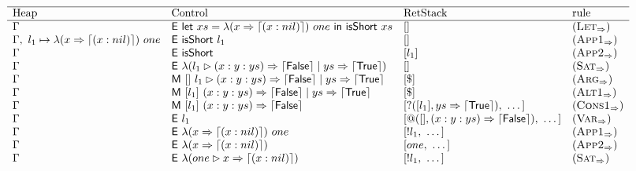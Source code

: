 \begin{figure*}
    \[
        \begin{array}{llll}
            \hline
            \text{Heap} & \text{Control}                                            & \text{RetStack}                                   & \text{rule}            \\
            \hline
            \Gamma      & \textsf{E}~\textsf{let}~xs = \lambda(x \Rightarrow \left\lceil (x : nil)\right\rceil)~one~\textsf{in}~\textsf{isShort}~xs & []                                                & (\textsc{Let}_{\Rightarrow})      \\
            \Gamma ,~ l_1 \mapsto \lambda(x \Rightarrow \left\lceil (x : nil)\right\rceil)~one
                        & \textsf{E}~\textsf{isShort}~l_1                                & []                                                & (\textsc{App1}_{\Rightarrow})     \\
            \Gamma      & \textsf{E}~\textsf{isShort}                                           & [l_1]                                             & (\textsc{App2}_{\Rightarrow})     \\
            \Gamma      & \textsf{E}~\lambda(l_1\rhd (x : y : ys) \Rightarrow \left\lceil \textsf{False}\right\rceil \mid ys \Rightarrow \left\lceil \textsf{True}\right\rceil)             & []                                                & (\textsc{Sat}_{\Rightarrow})      \\
            \Gamma      & \textsf{M}~[]~l_1\rhd (x : y : ys) \Rightarrow \left\lceil \textsf{False}\right\rceil \mid ys \Rightarrow \left\lceil \textsf{True}\right\rceil                  & [\$]                                              & (\textsc{Arg}_{\Rightarrow})      \\
            \Gamma      & \textsf{M}~[l_1]~(x : y : ys) \Rightarrow \left\lceil \textsf{False}\right\rceil \mid ys \Rightarrow \left\lceil \textsf{True}\right\rceil                               & [\$]                                              & (\textsc{Alt1}_{\Rightarrow})     \\
            \Gamma      & \textsf{M}~[l_1]~(x : y : ys) \Rightarrow \left\lceil \textsf{False}\right\rceil         & [?([l_1],ys \Rightarrow \left\lceil \textsf{True}\right\rceil),~\dots]         & (\textsc{Cons1}_{\Rightarrow})    \\
            \Gamma      & \textsf{E}~l_1                                                & [@([],(x : y : ys) \Rightarrow \left\lceil \textsf{False}\right\rceil),~\dots] & (\textsc{Var}_{\Rightarrow})      \\
            \Gamma      & \textsf{E}~\lambda(x \Rightarrow \left\lceil (x : nil)\right\rceil)~one                                 & [!l_1,~\dots]                                     & (\textsc{App1}_{\Rightarrow})     \\
            \Gamma      & \textsf{E}~\lambda(x \Rightarrow \left\lceil (x : nil)\right\rceil)                                            & [one,~\dots]                                      & (\textsc{App2}_{\Rightarrow})     \\
            \Gamma      & \textsf{E}~\lambda(one\rhd x \Rightarrow \left\lceil (x : nil)\right\rceil) & [!l_1,~\dots]                                     & (\textsc{Sat}_{\Rightarrow})      \\

\end{array}\]
\end{figure*}
